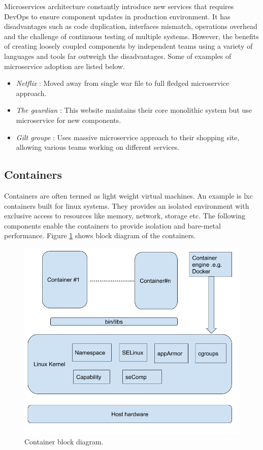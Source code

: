 \documentclass[conference]{IEEEtran}
\begin{document}
Microservices architecture constantly introduce new services that requires DevOps to ensure component updates in production environment. 
It has disadvantages such as code duplication, interfaces mismatch, operations overhead and the challenge of continuous testing of multiple systems. However, the benefits of creating loosely coupled components by independent teams using a variety of languages and tools far outweigh the disadvantages. Some of examples of microservice adoption are listed below.

\begin{itemize}
\item \textit{Netflix} : Moved away from single war file to full fledged microservice approach.
\item \textit{The gaurdian} : This website maintains their core monolithic system but use microservice for new components.
\item \textit{Gilt groupe} : Uses massive microservice approach to their shopping site, allowing various teams working on different services.
\end {itemize}

\subsection{Containers}
Containers \cite{lxc} \cite{kubernetes} are often termed as light weight virtual machines. An example is lxc containers built for linux systems. They provides an isolated environment with exclusive access to resources like memory, network, storage etc. The following components enable the containers to provide isolation and bare-metal performance. Figure \ref{containerBlockDiagram} shows block diagram of the containers.

\begin{figure}[htbp]
\centerline{\includegraphics[scale=0.3]{container.png}}
\caption{Container block diagram.}
\label{containerBlockDiagram}
\end{figure}
\end{document}
